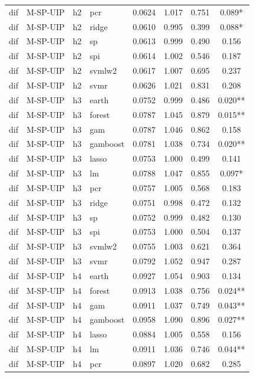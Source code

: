 \begin{ThreePartTable}
\begin{longtable}[t]{llclcccc}
dif & M-SP-UIP & h2 & pcr & 0.0624 & 1.017 & 0.751 & 0.089*\\
dif & M-SP-UIP & h2 & ridge & 0.0610 & 0.995 & 0.399 & 0.088*\\
dif & M-SP-UIP & h2 & sp & 0.0613 & 0.999 & 0.490 & 0.156\\
dif & M-SP-UIP & h2 & spi & 0.0614 & 1.002 & 0.546 & 0.187\\
dif & M-SP-UIP & h2 & svmlw2 & 0.0617 & 1.007 & 0.695 & 0.237\\
dif & M-SP-UIP & h2 & svmr & 0.0626 & 1.021 & 0.831 & 0.208\\
\addlinespace
dif & M-SP-UIP & h3 & earth & 0.0752 & 0.999 & 0.486 & 0.020**\\
dif & M-SP-UIP & h3 & forest & 0.0787 & 1.045 & 0.879 & 0.015**\\
dif & M-SP-UIP & h3 & gam & 0.0787 & 1.046 & 0.862 & 0.158\\
dif & M-SP-UIP & h3 & gamboost & 0.0781 & 1.038 & 0.734 & 0.020**\\
dif & M-SP-UIP & h3 & lasso & 0.0753 & 1.000 & 0.499 & 0.141\\
dif & M-SP-UIP & h3 & lm & 0.0788 & 1.047 & 0.855 & 0.097*\\
dif & M-SP-UIP & h3 & pcr & 0.0757 & 1.005 & 0.568 & 0.183\\
dif & M-SP-UIP & h3 & ridge & 0.0751 & 0.998 & 0.472 & 0.132\\
dif & M-SP-UIP & h3 & sp & 0.0752 & 0.999 & 0.482 & 0.130\\
dif & M-SP-UIP & h3 & spi & 0.0753 & 1.000 & 0.504 & 0.137\\
dif & M-SP-UIP & h3 & svmlw2 & 0.0755 & 1.003 & 0.621 & 0.364\\
dif & M-SP-UIP & h3 & svmr & 0.0792 & 1.052 & 0.947 & 0.287\\
\addlinespace
dif & M-SP-UIP & h4 & earth & 0.0927 & 1.054 & 0.903 & 0.134\\
dif & M-SP-UIP & h4 & forest & 0.0913 & 1.038 & 0.756 & 0.024**\\
dif & M-SP-UIP & h4 & gam & 0.0911 & 1.037 & 0.749 & 0.043**\\
dif & M-SP-UIP & h4 & gamboost & 0.0958 & 1.090 & 0.896 & 0.027**\\
dif & M-SP-UIP & h4 & lasso & 0.0884 & 1.005 & 0.558 & 0.156\\
dif & M-SP-UIP & h4 & lm & 0.0911 & 1.036 & 0.746 & 0.044**\\
dif & M-SP-UIP & h4 & pcr & 0.0897 & 1.020 & 0.682 & 0.285\\

\end{longtable}
\end{ThreePartTable}
